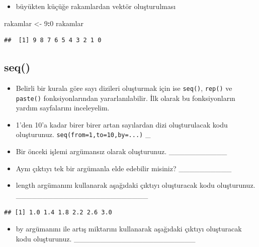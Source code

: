 \documentclass[
  oneside]{book}
\newenvironment{Shaded}{\begin{snugshade}}{\end{snugshade}}
\newcommand{\DecValTok}[1]{\textcolor[rgb]{0.00,0.00,0.81}{#1}}
\newcommand{\NormalTok}[1]{#1}
\newcommand{\OtherTok}[1]{\textcolor[rgb]{0.56,0.35,0.01}{#1}}
\newcommand{\SpecialCharTok}[1]{\textcolor[rgb]{0.81,0.36,0.00}{\textbf{#1}}}
\providecommand{\tightlist}{%
  \setlength{\itemsep}{0pt}\setlength{\parskip}{0pt}}
\begin{document}
\begin{itemize}
\tightlist
\item
  büyükten küçüğe rakamlardan vektör oluşturulması
\end{itemize}

\begin{Shaded}
\begin{Highlighting}[]
\NormalTok{rakamlar }\OtherTok{\textless{}{-}} \DecValTok{9}\SpecialCharTok{:}\DecValTok{0}
\NormalTok{rakamlar}
\end{Highlighting}
\end{Shaded}

\begin{verbatim}
##  [1] 9 8 7 6 5 4 3 2 1 0
\end{verbatim}

\hypertarget{seq}{%
\subsection{seq()}\label{seq}}

\begin{itemize}
\item
  Belirli bir kurala göre sayı dizileri oluşturmak için ise \texttt{seq()}, \texttt{rep()} ve \texttt{paste()} fonksiyonlarından yararlanılabilir. İlk olarak bu fonksiyonların yardım sayfalarını inceleyelim.
\item
  1'den 10'a kadar birer birer artan sayılardan dizi oluşturulacak kodu oluşturunuz. \texttt{seq(from=1,to=10,by=...)} \_
\item
  Bir önceki işlemi argümansız olarak oluşturunuz. \_\_\_\_\_\_\_\_\_\_\_
\item
  Aynı çıktıyı tek bir argümanla elde edebilir misiniz? \_\_\_\_\_\_\_\_\_\_
\item
  length argümanını kullanarak aşağıdaki çıktıyı oluşturacak kodu oluşturunuz. \_\_\_\_\_\_\_\_\_\_\_\_\_\_\_\_\_\_\_\_\_\_\_\_\_
\end{itemize}

\begin{verbatim}
## [1] 1.0 1.4 1.8 2.2 2.6 3.0
\end{verbatim}

\begin{itemize}
\tightlist
\item
  by argümanını ile artış miktarını kullanarak aşağıdaki çıktıyı oluşturacak kodu oluşturunuz. \_\_\_\_\_\_\_\_\_\_\_\_\_\_\_\_\_\_\_\_\_\_\_
\end{itemize}
\end{document}
